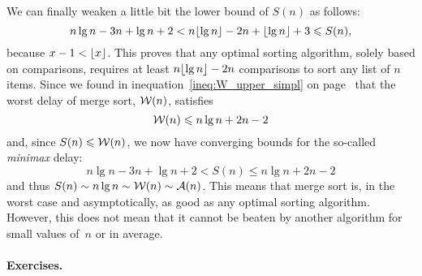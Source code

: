We can finally weaken a little bit the lower bound of \(S(n)\) as
follows:
\[
n\lg n - 3n + \lg n + 2 < n\lfloor{\lg n}\rfloor - 2n + \lfloor{\lg n}\rfloor + 3
                        \leqslant S(n),
\]
\noindent 
because \(x - 1 < \lfloor{x}\rfloor\). This proves that any optimal sorting
algorithm, solely based on comparisons, requires at least
\(n\lfloor{\lg n}\rfloor - 2n\) comparisons to sort any list of \(n\)
items. Since we found in inequation~\eqref{ineq:W_upper_simpl} on
page~\pageref{ineq:W_upper_simpl} that the worst delay of merge sort,
\(\mathcal{W}(n)\), satisfies
\[
\mathcal{W}(n) \leqslant n\lg n + 2n - 2
\]
and, since \(S(n) \leqslant \mathcal{W}(n)\), we now have converging
bounds for the so\hyp{}called \emph{minimax} delay:
\[
n\lg n - 3n + \lg n + 2 < S(n) \leqslant n\lg n + 2n - 2
\]
and thus \(S(n) \mathrel{\sim} n \lg n \mathrel{\sim} \mathcal{W}(n)
\mathrel{\sim} \mathcal{A}(n)\). This means that merge sort is, in the
worst case and asymptotically, as good as any optimal sorting
algorithm. However, this does not mean that it cannot be beaten by
another algorithm for small values of~\(n\) or in average.

\medskip

\paragraph{Exercises.}
\label{ex:merge_sort}

